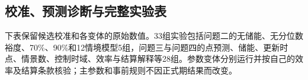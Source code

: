 \subsection{校准、预测诊断与完整实验表}
\label{app:experiments}
下表保留候选校准和各变体的原始数值。33组实验包括问题二的无储能、无分位数裕度、70\%、90\%和12情境模型5组，问题三与问题四的点预测、储能、更新时点、情景数、控制时域、效率与结算解释等28组。参数变体分别运行并按自己的效率及结算条款核验；主参数和事前规则不因正式期结果而改变。

